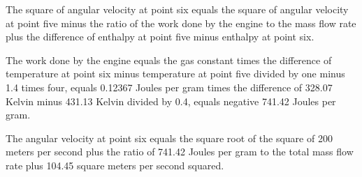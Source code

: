The square of angular velocity at point six equals the square of angular velocity at point five minus the ratio of the work done by the engine to the mass flow rate plus the difference of enthalpy at point five minus enthalpy at point six.

The work done by the engine equals the gas constant times the difference of temperature at point six minus temperature at point five divided by one minus 1.4 times four, equals 0.12367 Joules per gram times the difference of 328.07 Kelvin minus 431.13 Kelvin divided by 0.4, equals negative 741.42 Joules per gram.

The angular velocity at point six equals the square root of the square of 200 meters per second plus the ratio of 741.42 Joules per gram to the total mass flow rate plus 104.45 square meters per second squared.